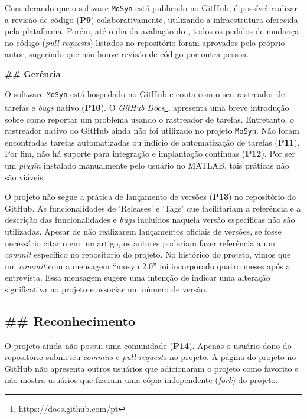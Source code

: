 Considerando que o software \texttt{MoSyn} está publicado no GitHub, é possível realizar a revisão de código (\textbf{P9}) colaborativamente, utilizando a infraestrutura oferecida pela plataforma.  
Porém, até o dia da avaliação do \RS, todos os pedidos de mudança no código (\textit{pull requests}) listados no repositório foram aprovados pelo próprio autor, sugerindo que não houve revisão de código por outra pessoa.

\noindent \textbf{\#\# Gerência}

O software \texttt{MoSyn} está hospedado no GitHub e conta com o seu rastreador de tarefas e \textit{bugs} nativo (\textbf{P10}). 
O \textit{GitHub Docs}\footnote{\url{https://docs.github.com/pt}}, apresenta uma breve introdução sobre como reportar um problema usando o rastreador de tarefas. 
Entretanto, o rastreador nativo do GitHub ainda não foi utilizado no projeto \texttt{MoSyn}.
Não foram encontradas tarefas automatizadas ou indício de automatização de tarefas (\textbf{P11}).
Por fim, não há suporte para integração e implantação contínuas (\textbf{P12}). Por ser um \textit{plugin} instalado manualmente pelo usuário no MATLAB, tais práticas não são viáveis.

O projeto não segue a prática de lançamento de versões (\textbf{P13}) no repositório do GitHub. As funcionalidades de 'Releases' e 'Tags' que facilitariam a referência e a descrição das funcionalidades e \textit{bugs} incluídos naquela versão específicas não são utilizadas.
Apesar de não realizarem lançamentos oficiais de versões, se fosse necessário citar o \RSw em um artigo, os autores poderiam fazer referência a um \textit{commit} específico no repositório do projeto.
No histórico do projeto, vimos que um \textit{commit} com a mensagem ``mosyn 2.0'' foi incorporado quatro meses após a entrevista. 
Essa mensagem sugere uma intenção de indicar uma alteração significativa no projeto e associar um número de versão.

\subsection*{\#\# Reconhecimento}

O projeto ainda não possui uma comunidade (\textbf{P14}).
Apenas o usuário dono do repositório submeteu \textit{commits} e \textit{pull requests} no projeto. A página do projeto no GitHub não apresenta outros usuários que adicionaram o projeto como favorito e não mostra usuários que fizeram uma cópia independente (\textit{fork}) do projeto.


